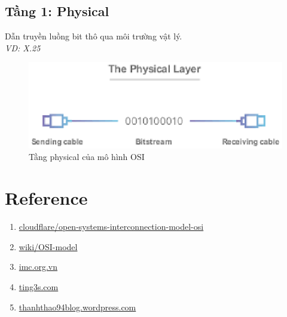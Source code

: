 \documentclass[9pt,twocolumn,twoside,lineno]{gsajnl}
\begin{document}
\subsection{Tầng 1: Physical}
Dẫn truyền luồng bit thô qua môi trường vật lý.\\ \textit{VD: X.25}
\begin{figure}[H]
  \centering
  \includegraphics[scale=0.5]{q3_8}
  \caption{Tầng physical của mô hình OSI}
\end{figure}



\section{Reference}
\begin{enumerate}

  \item \href{https://www.cloudflare.com/learning/ddos/glossary/open-systems-interconnection-model-osi/}{cloudflare/open-systems-interconnection-model-osi}
  \item \href{https://en.wikipedia.org/wiki/OSI_model}{wiki/OSI-model}
  \item \href{https://imc.org.vn/tang-mang-la-gi-va-tai-sao-phai-phan-chia-tang-mang.html}{imc.org.vn}
  \item \href{https://ting3s.com/post/chuong-2-mang-may-tinh-kien-truc-phan-tang-va-mo-hinh-osi-mang-may-tinh-computer-network-309}{ting3s.com}
  \item \href{https://thanhthao94blog.wordpress.com/2015/01/14/so-sanh-chuyen-mach-goi-va-chuyen-mach-kenh/}{thanhthao94blog.wordpress.com}
\end{enumerate}
\end{document}
